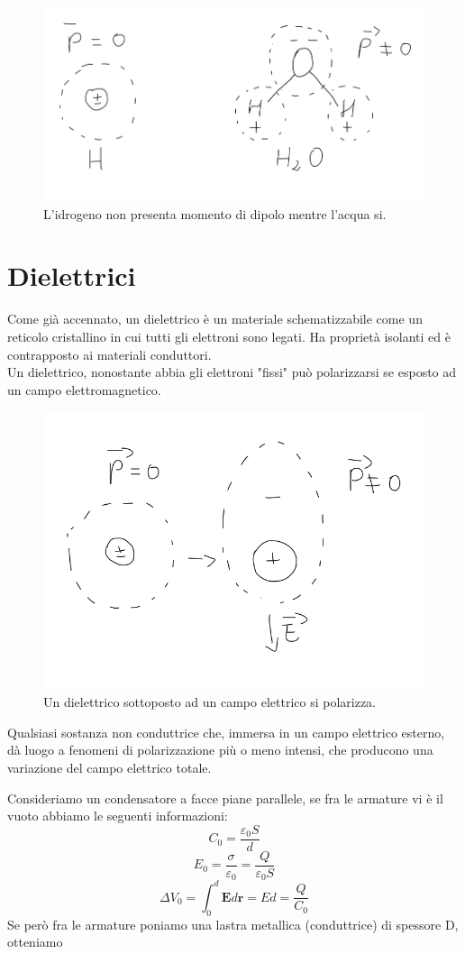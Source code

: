 \documentclass[
10pt, %
a4paper, %
oneside, %
headinclude,footinclude, %
BCOR5mm, %
]{scrartcl}
\begin{document}
\begin{figure}[h!]
	\centering
	\includegraphics[width=0.5\linewidth]{images/dipolo_H_H2O}
	\caption{L'idrogeno non presenta momento di dipolo mentre l'acqua si.}
	\label{fig:dipolohh2o}
\end{figure}
\FloatBarrier
\section{Dielettrici}
Come già accennato, un dielettrico è un materiale schematizzabile come un reticolo cristallino in cui tutti gli elettroni sono legati. Ha proprietà isolanti ed è contrapposto ai materiali conduttori.\\
Un dielettrico, nonostante abbia gli elettroni "fissi" può polarizzarsi se esposto ad un campo elettromagnetico.
\begin{figure}[h!]
	\centering
	\includegraphics[width=0.4\linewidth]{images/dielettrico_idrogeno}
	\caption{Un dielettrico sottoposto ad un campo elettrico si polarizza.}
	\label{fig:dielettricoidrogeno}
\end{figure}
\FloatBarrier
\begin{definizione}[Dielettrico]
	Qualsiasi sostanza non conduttrice che, immersa in un campo elettrico esterno, dà luogo a fenomeni di polarizzazione più o meno intensi, che producono una variazione del campo elettrico totale.
\end{definizione}
Consideriamo un condensatore a facce piane parallele, se fra le armature vi è il vuoto abbiamo le seguenti informazioni:
\[C_0 = \frac{\varepsilon_0S}{d}\]
\[E_0 = \frac{\sigma}{\varepsilon_0} = \frac{Q}{\varepsilon_0 S}\]
\[\Delta V_0 = \int_{0}^{d}\mathbf{E}d\mathbf{r} = Ed = \frac{Q}{C_0}\]
Se però fra le armature poniamo una lastra metallica (conduttrice) di spessore D, otteniamo
\end{document}
